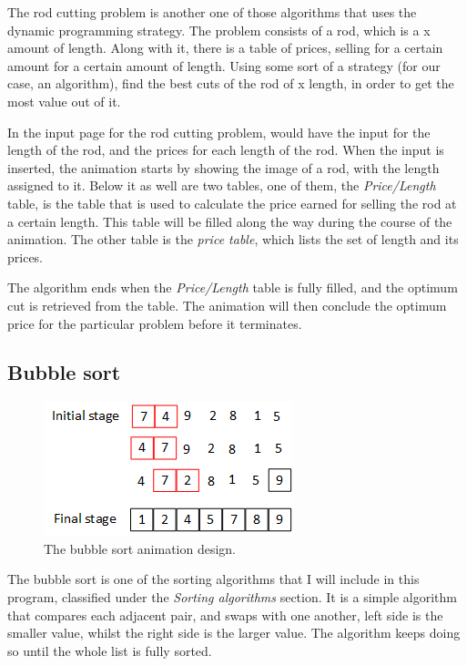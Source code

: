 The rod cutting problem is another one of those algorithms that uses the dynamic programming strategy. The problem consists of a rod, which is a x amount of length. Along with it, there is a table of prices, selling for a certain amount for a certain amount of length. Using some sort of a strategy (for our case, an algorithm), find the best cuts of the rod of x length, in order to get the most value out of it.

In the input page for the rod cutting problem, would have the input for the length of the rod, and the prices for each length of the rod. When the input is inserted, the animation starts by showing the image of a rod, with the length assigned to it. Below it as well are two tables, one of them, the \textit{Price/Length} table, is the table that is used to calculate the price earned for selling the rod at a certain length. This table will be filled along the way during the course of the animation. The other table is the \textit{price table}, which lists the set of length and its prices. 

The algorithm ends when the \textit{Price/Length} table is fully filled, and the optimum cut is retrieved from the table. The animation will then conclude the optimum price for the particular problem before it terminates.

\subsection{Bubble sort}

\begin{figure}[H]
\centering
\includegraphics[scale=1.5]{images/report_images/animationDesignBubbleSort.png}
\caption{The bubble sort animation design.}
\label{animationDesignBubbleSort}
\end{figure}

The bubble sort is one of the sorting algorithms that I will include in this program, classified under the \textit{Sorting algorithms} section. It is a simple algorithm that compares each adjacent pair, and swaps with one another, left side is the smaller value, whilst the right side is the larger value. The algorithm keeps doing so until the whole list is fully sorted.

